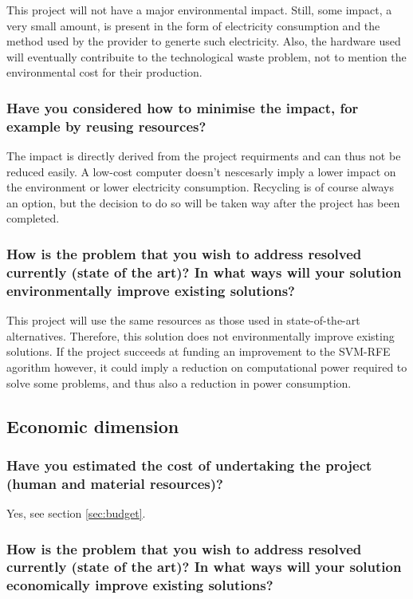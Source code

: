 This project will not have a major environmental impact. Still, some impact, a very small amount, is present in the form of electricity consumption and the method used by the provider to generte such electricity. Also, the hardware used will eventually contribuite to the technological waste problem, not to mention the environmental cost for their production.

\subsubsection*{Have you considered how to minimise the impact, for example by reusing re\-sources?}

The impact is directly derived from the project requirments and can thus not be reduced easily. A low-cost computer doesn't nescesarly imply a lower impact on the environment or lower electricity consumption. Recycling is of course always an option, but the decision to do so will be taken way after the project has been completed.

\subsubsection*{How is the problem that you wish to address resolved currently (state of the art)? In what ways will your solution environmentally improve exist\-ing solutions?}

This project will use the same resources as those used in state-of-the-art alternatives. Therefore, this solution does not environmentally improve existing solutions. If the project succeeds at funding an improvement to the SVM-RFE agorithm however, it could imply a reduction on computational power required to solve some problems, and thus also a reduction in power consumption.

\subsection{Economic dimension}

\subsubsection*{Have you estimated the cost of undertaking the project (human and material re\-sources)?}

Yes, see section \ref{sec:budget}.

\subsubsection*{How is the problem that you wish to address resolved currently (state of the art)? In what ways will your solution economically improve existing solutions?}

